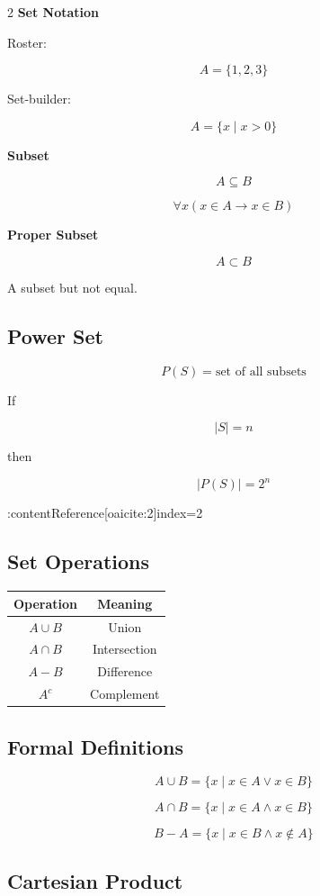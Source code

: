 \documentclass[10pt]{article}
\begin{document}
\begin{multicols}{2}
\textbf{Set Notation}

Roster:

\[
A = \{1,2,3\}
\]

Set-builder:

\[
A = \{x \mid x > 0\}
\]

\textbf{Subset}

\[
A \subseteq B
\]

\[
\forall x (x \in A \rightarrow x \in B)
\]

\textbf{Proper Subset}

\[
A \subset B
\]

A subset but not equal.

\subsection*{Power Set}

\[
P(S) = \text{set of all subsets}
\]

If

\[
|S| = n
\]

then

\[
|P(S)| = 2^n
\]

:contentReference[oaicite:2]{index=2}

\subsection*{Set Operations}

\begin{tabular}{c|c}
Operation & Meaning \\
\hline
$A \cup B$ & Union \\
$A \cap B$ & Intersection \\
$A-B$ & Difference \\
$A^c$ & Complement
\end{tabular}

\subsection*{Formal Definitions}

\[
A \cup B = \{x \mid x \in A \lor x \in B\}
\]

\[
A \cap B = \{x \mid x \in A \land x \in B\}
\]

\[
B-A = \{x \mid x \in B \land x \notin A\}
\]

\subsection*{Cartesian Product}


\end{multicols}
\end{document}
